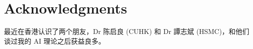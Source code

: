 \documentclass[12pt]{article}
\begin{document}

\section*{Acknowledgments}

最近在香港认识了两个朋友，Dr 陈启良 (CUHK) 和 Dr 譚志斌 (HSMC)，和他们谈过我的 AI 理论之后获益良多。



\onecolumn

\end{document}
